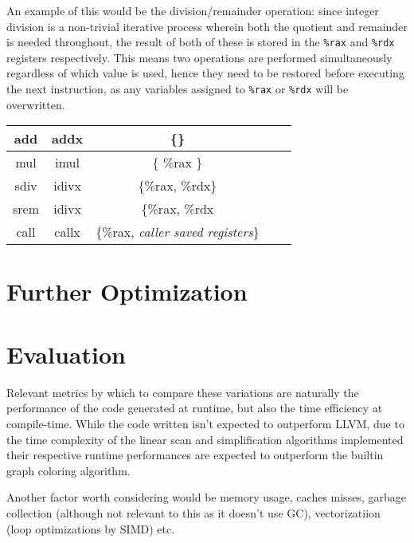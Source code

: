 \documentclass{article}
\begin{document}
An example of this would be the division/remainder operation: since integer division is a non-trivial iterative process wherein both the quotient and remainder is needed throughout, the result of both of these is stored in the \lstinline!%rax! and \lstinline!%rdx! registers respectively. This means two operations are performed simultaneously regardless of which value is used, hence they need to be restored before executing the next instruction, as any variables assigned to \lstinline!%rax! or \lstinline!%rdx! will be overwritten.

\begin{center}
\begin{tabular}{|c||c|c|c|c|} 
 \hline
 add & addx & \{\}\\
 \hline
 mul & imul & \{ \%rax \} \\
 \hline
 sdiv & idivx & \{\%rax, \%rdx\} \\
 \hline
 srem & idivx & \{\%rax, \%rdx \\
 \hline
   call & callx & \{\%rax, \textit{caller saved registers}\} \\
 \hline
 \hline
\end{tabular}
\end{center}

%

\section{Further Optimization}



\section{Evaluation}

Relevant metrics by which to compare these variations are naturally the performance of the code generated at runtime, but also the time efficiency at compile-time. While the code written isn't expected to outperform LLVM, due to the time complexity of the linear scan and simplification algorithms implemented their respective runtime performances are expected to outperform the builtin graph coloring algorithm.


Another factor worth considering would be memory usage, caches misses, garbage collection (although not relevant to this as it doesn't use GC), vectorizatiion (loop optimizations by SIMD) etc.
\end{document}

